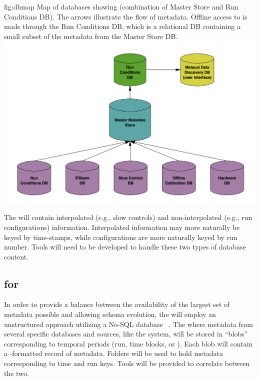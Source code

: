 \documentclass[../main-v1.tex]{subfiles}
\begin{document}
\begin{dunefigure}
{fig:dbmap} 
{Map of  databases showing  (combination of Master Store and Run Conditions DB). The arrows illustrate the flow of metadata. Offline access to  is made through the Run Conditions DB, which is a relational DB containing a small subset of the metadata from the Master Store DB. }
\includegraphics[width=.9\columnwidth]{graphics/Databases/DBSystem-cartoon.png}
\end{dunefigure}

The  will contain interpolated (e.g., slow controls) and non-interpolated (e.g., run configurations) information. Interpolated information may more naturally be keyed by time-stamps, while configurations are more naturally keyed by run number. Tools will need to be developed to handle these two types of database content. 

\subsection{ for }

In order to provide a balance between the availability of the largest set of metadata possible  and allowing schema evolution,  the   will employ an unstructured approach utilizing a No-SQL database ~\cite{bib:ucondb}. The  where metadata from several specific databases and sources, like the  system, will be stored in ``blobs'' corresponding to temporal periods (run, time blocks, or ). Each blob will contain a -formatted record of metadata. Folders will be used to hold metadata corresponding to time and run keys. Tools will be provided to correlate between the two. 
\end{document}
